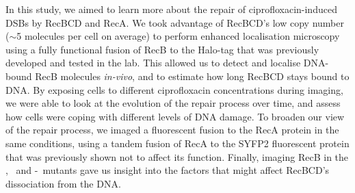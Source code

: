In this study, we aimed to learn more about the repair of ciprofloxacin-induced DSBs by RecBCD and RecA. We took advantage of RecBCD's low copy number ($\sim$5 molecules per cell on average\cite{Lepore2019a}) to perform enhanced localisation microscopy\cite{Yu2006, Elf2007} using a fully functional fusion of RecB to the Halo-tag that was previously developed and tested in the lab\cite{Lepore2019a}. This allowed us to detect and localise DNA-bound RecB molecules \emph{in-vivo}, and to estimate how long RecBCD stays bound to DNA. By exposing cells to different ciprofloxacin concentrations during imaging, we were able to look at the evolution of the repair process over time, and assess how cells were coping with different levels of DNA damage. To broaden our view of the repair process, we imaged a fluorescent fusion to the RecA protein in the same conditions, using a tandem fusion of RecA to the SYFP2 fluorescent protein that was previously shown not to affect its function\cite{Wiktor2021}. Finally, imaging RecB in the \dreca, \teneighty\ and \dreca-\teneighty\ mutants gave us insight into the factors that might affect RecBCD's dissociation from the DNA.
